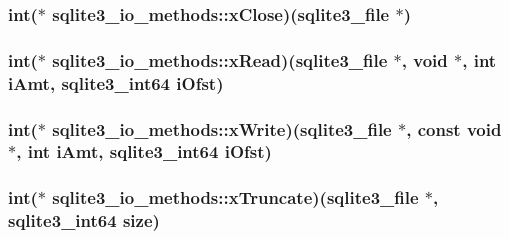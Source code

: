 \hypertarget{structsqlite3__io__methods_3c021d16959e0533f507b3212681a22e}{
\subsubsection[xClose]{\setlength{\rightskip}{0pt plus 5cm}int($\ast$ {\bf sqlite3\_\-io\_\-methods::xClose})({\bf sqlite3\_\-file} $\ast$)}}
\label{structsqlite3__io__methods_3c021d16959e0533f507b3212681a22e}


\hypertarget{structsqlite3__io__methods_19870694752f65e8738d89d871d0ca7f}{
\subsubsection[xRead]{\setlength{\rightskip}{0pt plus 5cm}int($\ast$ {\bf sqlite3\_\-io\_\-methods::xRead})({\bf sqlite3\_\-file} $\ast$, void $\ast$, int iAmt, {\bf sqlite3\_\-int64} iOfst)}}
\label{structsqlite3__io__methods_19870694752f65e8738d89d871d0ca7f}


\hypertarget{structsqlite3__io__methods_803b39bc86bbff522602597fa4390e0f}{
\subsubsection[xWrite]{\setlength{\rightskip}{0pt plus 5cm}int($\ast$ {\bf sqlite3\_\-io\_\-methods::xWrite})({\bf sqlite3\_\-file} $\ast$, const void $\ast$, int iAmt, {\bf sqlite3\_\-int64} iOfst)}}
\label{structsqlite3__io__methods_803b39bc86bbff522602597fa4390e0f}


\hypertarget{structsqlite3__io__methods_981cc60fc305bfb38eecd7123a513a20}{
\subsubsection[xTruncate]{\setlength{\rightskip}{0pt plus 5cm}int($\ast$ {\bf sqlite3\_\-io\_\-methods::xTruncate})({\bf sqlite3\_\-file} $\ast$, {\bf sqlite3\_\-int64} size)}}
\label{structsqlite3__io__methods_981cc60fc305bfb38eecd7123a513a20}


